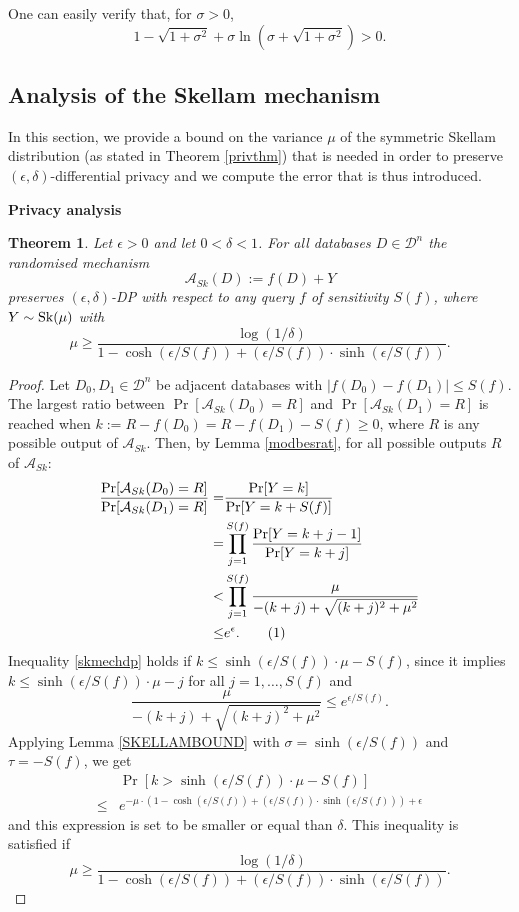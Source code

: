 \documentclass[10pt]{extarticle}
\newcommand\numberthis{\addtocounter{equation}{1}\tag{\theequation}}
\newtheorem{Thm}{Theorem}
\begin{document}
\noindent One can easily verify that, for $\sigma>0$,
\[1-\sqrt{1+\sigma^2}+\sigma\ln(\sigma + \sqrt{1+\sigma^2})> 0.\]

\subsection{Analysis of the Skellam mechanism}

In this section, we provide a bound on the variance $\mu$ of the symmetric Skellam distribution (as stated in Theorem \ref{privthm}) that is needed in order to preserve $(\epsilon,\delta)$-differential privacy and we compute the error that is thus introduced.\par\bigskip\bigskip

\noindent\textbf{Privacy analysis}



\begin{Thm}\label{skmech} Let $\epsilon>0$ and let $0<\delta<1$. For all databases $D\in\mathcal{D}^n$ the randomised mechanism \[\mathcal{A}_{Sk}(D):=f(D)+Y\]
preserves $(\epsilon,\delta)$-\mbox{\upshape\sffamily DP} with respect to any query $f$ of sensitivity $S(f)$, where $Y\sim\text{\upshape Sk}(\mu)$ with 
\[\mu\geq\frac{\log(1/\delta)}{1-\cosh(\epsilon/S(f))+(\epsilon/S(f))\cdot\sinh(\epsilon/S(f))}.\]
\end{Thm}
\begin{proof} Let $D_0, D_1\in\mathcal{D}^n$ be adjacent databases with $|f(D_0)-f(D_1)|\leq S(f)$. The largest ratio between $\Pr[\mathcal{A}_{Sk}(D_0)=R]$ and $\Pr[\mathcal{A}_{Sk}(D_1)=R]$ is reached when $k:=R-f(D_0)=R-f(D_1)-S(f)\geq 0$, where $R$ is any possible output of $\mathcal{A}_{Sk}$.
Then, by Lemma \ref{modbesrat}, for all possible outputs $R$ of $\mathcal{A}_{Sk}$:
\begin{align*} \frac{\Pr[\mathcal{A}_{Sk}(D_0)=R]}{\Pr[\mathcal{A}_{Sk}(D_1)=R]}= & \frac{\Pr[Y=k]}{\Pr[Y=k+S(f)]}\\
 = & \prod_{j=1}^{S(f)}\frac{\Pr[Y=k+j-1]}{\Pr[Y=k+j]}\\
 < & \prod_{j=1}^{S(f)}\frac{\mu}{-(k+j)+\sqrt{(k+j)^2+\mu^2}}\\
 \leq & e^\epsilon.\numberthis\label{skmechdp}
\end{align*}
Inequality \eqref{skmechdp} holds if $k\leq\sinh(\epsilon/S(f))\cdot\mu-S(f)$, since it implies $k\leq\sinh(\epsilon/S(f))\cdot\mu-j$ for all $j=1,\ldots,S(f)$ and
\[\frac{\mu}{-(k+j)+\sqrt{(k+j)^2+\mu^2}}\leq e^{\epsilon/S(f)}.\] 
Applying Lemma \ref{SKELLAMBOUND} with $\sigma=\sinh(\epsilon/S(f))$ and $\tau=-S(f)$, we get
\begin{align*} & \Pr[k>\sinh(\epsilon/S(f))\cdot\mu-S(f)]\\
\leq & e^{-\mu\cdot(1-\cosh(\epsilon/S(f))+(\epsilon/S(f))\cdot\sinh(\epsilon/S(f)))+\epsilon}
\end{align*}
and this expression is set to be smaller or equal than $\delta$. This inequality is satisfied if
\[\mu\geq\frac{\log(1/\delta)}{1-\cosh(\epsilon/S(f))+(\epsilon/S(f))\cdot\sinh(\epsilon/S(f))}.\]
\end{proof}
\end{document}
